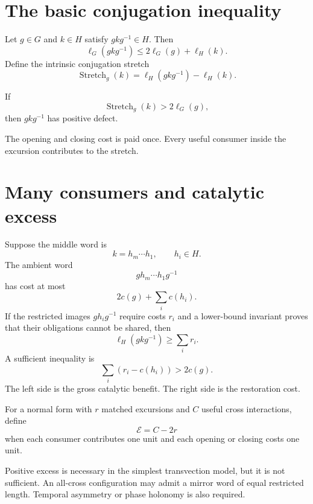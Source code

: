 \section{The basic conjugation inequality}
Let $g\in G$ and $k\in H$ satisfy $gkg^{-1}\in H$.  Then
\[
\ell_G(gkg^{-1})
\le 2\ell_G(g)+\ell_H(k).
\]
Define the intrinsic conjugation stretch
\[
\operatorname{Stretch}_g(k)
=
\ell_H(gkg^{-1})-\ell_H(k).
\]

\begin{proposition}
If
\[
\operatorname{Stretch}_g(k)>2\ell_G(g),
\]
then $gkg^{-1}$ has positive defect.
\end{proposition}
The opening and closing cost is paid once.  Every useful consumer inside the excursion contributes to the stretch.

\section{Many consumers and catalytic excess}
Suppose the middle word is
\[
k=h_m\cdots h_1,
\qquad h_i\in H.
\]
The ambient word
\[
gh_m\cdots h_1g^{-1}
\]
has cost at most
\[
2c(g)+\sum_i c(h_i).
\]
If the restricted images $gh_ig^{-1}$ require costs $r_i$ and a lower-bound invariant proves that their obligations cannot be shared, then
\[
\ell_H(gkg^{-1})\ge\sum_i r_i.
\]
A sufficient inequality is
\[
\sum_i(r_i-c(h_i))>2c(g).
\]
The left side is the gross catalytic benefit.  The right side is the restoration cost.

\begin{definition}
For a normal form with $r$ matched excursions and $C$ useful cross interactions, define
\[
\mathcal E=C-2r
\]
when each consumer contributes one unit and each opening or closing costs one unit.
\end{definition}
Positive excess is necessary in the simplest transvection model, but it is not sufficient.  An all-cross configuration may admit a mirror word of equal restricted length.  Temporal asymmetry or phase holonomy is also required.

